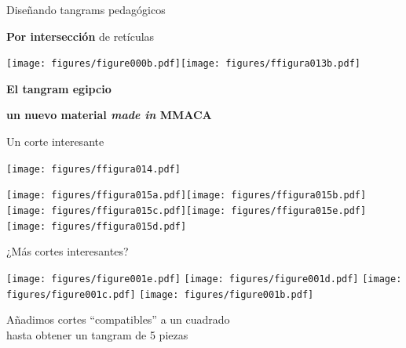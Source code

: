 \documentclass[14pt,aspectratio=169,usenames,dvipsnames]{beamer}
\begin{document}

    \begin{frame}{Diseñando tangrams pedagógicos}
        \begin{center}
            \textbf{Por intersección} de retículas\\

            \bigskip \bigskip

            \texttt{[image: figures/figure000b.pdf]}\qquad\texttt{[image: figures/ffigura013b.pdf]}\\

            \bigskip \bigskip
        \end{center}
    \end{frame}


    \begin{frame}{}
        \begin{center}
            \textbf{\huge El tangram egipcio}\\

            \bigskip

            \textbf{\large un nuevo material \emph{made in} MMACA}
        \end{center}
    \end{frame}


    \begin{frame}{Un corte interesante}
        \begin{center}
            \texttt{[image: figures/ffigura014.pdf]}\\

            \vspace{2.5em}

            \texttt{[image: figures/ffigura015a.pdf]}\quad\texttt{[image: figures/ffigura015b.pdf]}\quad\texttt{[image: figures/ffigura015c.pdf]}\;\;\texttt{[image: figures/ffigura015e.pdf]}\quad\texttt{[image: figures/ffigura015d.pdf]}\\
        \end{center}
    \end{frame}


    \begin{frame}{¿Más cortes interesantes?}
        \begin{center}
            \texttt{[image: figures/figure001e.pdf]} \quad \texttt{[image: figures/figure001d.pdf]} \quad \texttt{[image: figures/figure001c.pdf]} \quad \texttt{[image: figures/figure001b.pdf]} \\
            \vspace{1.5em}

            Añadimos cortes ``compatibles'' a un cuadrado\\hasta obtener un tangram de 5 piezas
        \end{center}
    \end{frame}
\end{document}
